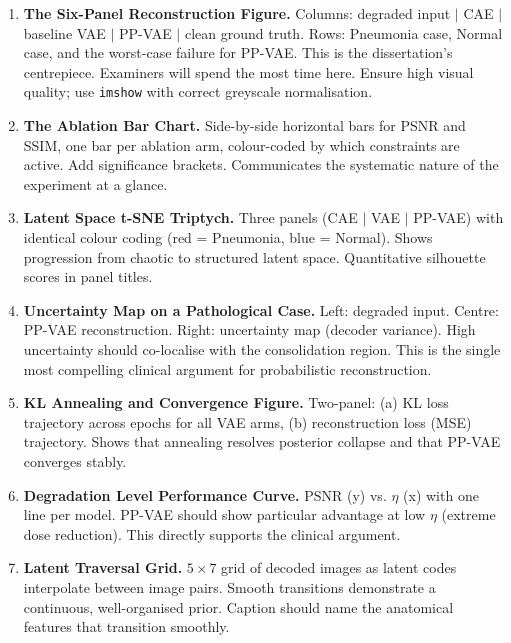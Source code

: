 \documentclass[12pt, a4paper]{article}
\begin{document}
\begin{enumerate}

\item \textbf{The Six-Panel Reconstruction Figure.}
Columns: degraded input $\mid$ CAE $\mid$ baseline VAE $\mid$ PP-VAE $\mid$ clean ground truth.
Rows: Pneumonia case, Normal case, and the worst-case failure for PP-VAE.
This is the dissertation's centrepiece. Examiners will spend the most
time here. Ensure high visual quality; use \texttt{imshow} with
correct greyscale normalisation.

\item \textbf{The Ablation Bar Chart.}
Side-by-side horizontal bars for PSNR and SSIM, one bar per ablation arm,
colour-coded by which constraints are active. Add significance brackets.
Communicates the systematic nature of the experiment at a glance.

\item \textbf{Latent Space t-SNE Triptych.}
Three panels (CAE $\mid$ VAE $\mid$ PP-VAE) with identical colour coding
(red = Pneumonia, blue = Normal). Shows progression from chaotic to
structured latent space. Quantitative silhouette scores in panel titles.

\item \textbf{Uncertainty Map on a Pathological Case.}
Left: degraded input. Centre: PP-VAE reconstruction. Right: uncertainty
map (decoder variance). High uncertainty should co-localise with the
consolidation region. This is the single most compelling clinical argument
for probabilistic reconstruction.

\item \textbf{KL Annealing and Convergence Figure.}
Two-panel: (a) KL loss trajectory across epochs for all VAE arms,
(b) reconstruction loss (MSE) trajectory. Shows that annealing resolves
posterior collapse and that PP-VAE converges stably.

\item \textbf{Degradation Level Performance Curve.}
PSNR (y) vs. $\eta$ (x) with one line per model. PP-VAE should show
particular advantage at low $\eta$ (extreme dose reduction). This
directly supports the clinical argument.

\item \textbf{Latent Traversal Grid.}
$5 \times 7$ grid of decoded images as latent codes interpolate between
image pairs. Smooth transitions demonstrate a continuous, well-organised
prior. Caption should name the anatomical features that transition smoothly.


\end{enumerate}
\end{document}
